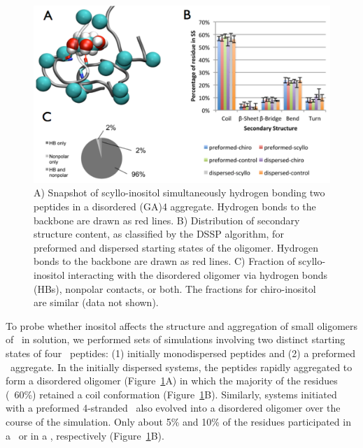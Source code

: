 \begin{figure}[htbp]
  \centering
  \includegraphics[width=6in]{figures/results1/GA4_paper_figures_submitted-4-rearranged}
  \caption[Binding of scyllo-inositol to the disordered oligomer of (GA)4.]{A) Snapshot of scyllo-inositol simultaneously hydrogen bonding two peptides in a disordered (GA)4 aggregate. Hydrogen bonds to the backbone are drawn as red lines. B) Distribution of secondary structure content, as classified by the DSSP algorithm, for preformed and dispersed starting states of the oligomer. Hydrogen bonds to the backbone are drawn as red lines. C) Fraction of scyllo-inositol interacting with the disordered oligomer via hydrogen bonds (HBs), nonpolar contacts, or both. The fractions for chiro-inositol are similar (data not shown).}
   \label{fig:figure4}
\end{figure}

To probe whether inositol affects the structure and aggregation of small oligomers of \gafour\ in solution, we performed sets of simulations involving two distinct starting states of four \gafour\ peptides: (1) initially monodispersed peptides and (2) a preformed \bsheet\ aggregate. In the initially dispersed systems, the peptides rapidly aggregated to form a disordered oligomer (Figure~\ref{fig:figure4}A) in which the majority of the residues (~60\%) retained a coil conformation (Figure~\ref{fig:figure4}B). Similarly, systems initiated with a preformed 4-stranded \bsheet\ also evolved into a disordered oligomer over the course of the simulation. Only about 5\% and 10\% of the residues participated in a \bsheet\ or in a \bbridge, respectively (Figure~\ref{fig:figure4}B).
	

